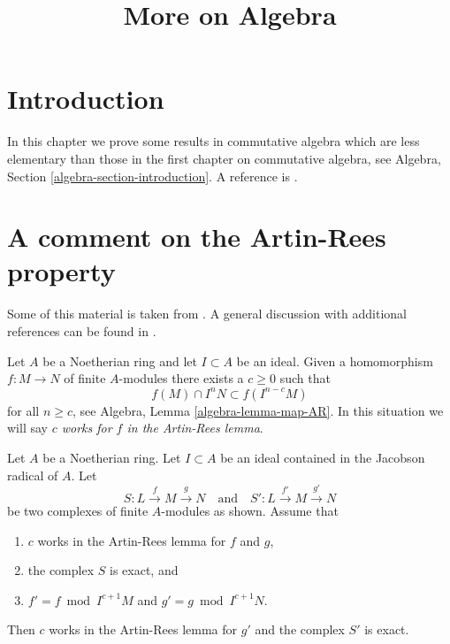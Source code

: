 

%


\title{More on Algebra}


\maketitle

\label{section-phantom}

\tableofcontents



\section{Introduction}
\label{section-introduction}

\noindent
In this chapter we prove some results in commutative algebra which
are less elementary than those in the first chapter on commutative
algebra, see
Algebra, Section \ref{algebra-section-introduction}.
A reference is \cite{MatCA}.






\section{A comment on the Artin-Rees property}
\label{section-artin-rees}

\noindent
Some of this material is taken from \cite{conrad-dejong}. A general
discussion with additional references can be found in
\cite[Section 1]{Eis}.

\medskip\noindent
Let $A$ be a Noetherian ring and let $I \subset A$ be an ideal. Given a
homomorphism $f : M \to N$ of finite $A$-modules there exists a $c \geq 0$
such that
$$
f(M) \cap I^nN \subset f(I^{n - c}M)
$$
for all $n \geq c$, see Algebra, Lemma \ref{algebra-lemma-map-AR}. In this
situation we will say {\it $c$ works for $f$ in the Artin-Rees lemma}.

\begin{lemma}
\label{lemma-approximate-complex}
Let $A$ be a Noetherian ring. Let $I \subset A$ be an ideal contained in
the Jacobson radical of $A$. Let
$$
S : L \xrightarrow{f} M \xrightarrow{g} N
\quad\text{and}\quad
S' : L \xrightarrow{f'} M \xrightarrow{g'} N
$$
be two complexes of finite $A$-modules as shown. Assume that
\begin{enumerate}
\item $c$ works in the Artin-Rees lemma for $f$ and $g$,
\item the complex $S$ is exact, and
\item $f' = f \bmod I^{c + 1}M$ and $g' = g \bmod I^{c + 1}N$.
\end{enumerate}
Then $c$ works in the Artin-Rees lemma for $g'$ and the
complex $S'$ is exact.
\end{lemma}

